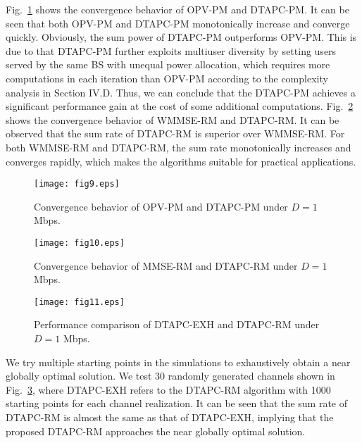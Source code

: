\documentclass[journal]{IEEEtran}
\begin{document}
Fig.~\ref{fig14} shows the convergence behavior of OPV-PM and DTAPC-PM.
It can be seen that both OPV-PM and DTAPC-PM monotonically increase and converge quickly.
Obviously, the sum power of DTAPC-PM outperforms OPV-PM.
This is due to that DTAPC-PM further exploits multiuser diversity by setting users served by the same BS with unequal power allocation, which requires more computations in each iteration than OPV-PM according to the complexity analysis in Section IV.D.
Thus, we can conclude that the DTAPC-PM achieves a significant performance gain at the cost of some additional computations.
Fig.~\ref{fig142} shows the convergence behavior of WMMSE-RM and DTAPC-RM.
It can be observed that the sum rate of DTAPC-RM is superior over WMMSE-RM.
For both WMMSE-RM and DTAPC-RM, the sum rate monotonically increases and converges rapidly, which makes the algorithms suitable for practical applications.

\begin{figure}
\centering
\texttt{[image: fig9.eps]}
\vspace{-1em}
\caption{Convergence behavior of OPV-PM and DTAPC-PM under $D=1$ Mbps.\label{fig14}}
\vspace{-1em}
\end{figure}

\begin{figure}
\centering
\texttt{[image: fig10.eps]}
\vspace{-1em}
\caption{Convergence behavior of MMSE-RM and DTAPC-RM under $D=1$ Mbps.\label{fig142}}
\vspace{-1em}
\end{figure}

\begin{figure}
\centering
\texttt{[image: fig11.eps]}
\caption{Performance comparison of DTAPC-EXH and DTAPC-RM under $D=1$ Mbps.\label{fig17}}
\end{figure}


We try multiple starting points in the simulations to exhaustively obtain a near globally optimal solution.
We test 30 randomly generated channels shown in Fig.~\ref{fig17}, where DTAPC-EXH refers to the DTAPC-RM algorithm with 1000 starting points for each channel realization.
It can be seen that the sum rate of DTAPC-RM is almost the same as that of DTAPC-EXH, implying that the proposed DTAPC-RM approaches the near globally optimal solution.
\end{document}
